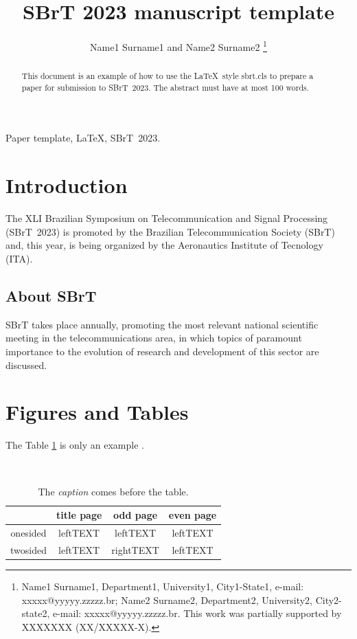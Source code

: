 \documentclass[english]{sbrt}
\begin{document}
\title{SBrT 2023 manuscript template}

\author{Name1 Surname1 and Name2 Surname2
\thanks{Name1 Surname1, Department1, University1, City1-State1, e-mail: xxxxx@yyyyy.zzzzz.br; Name2 Surname2, Department2, University2, City2-state2, e-mail: xxxxx@yyyyy.zzzzz.br. This work was partially supported by XXXXXXX (XX/XXXXX-X).}%
}

\maketitle



\begin{abstract}
This document is an example of how to use the \LaTeX\ style sbrt.cls to prepare a paper for submission to SBrT~2023. The abstract must have at most 100 words.
\end{abstract}
\begin{keywords}
Paper template, \LaTeX, SBrT~2023.
\end{keywords}


\section{Introduction}

The XLI Brazilian Symposium on Telecommunication and Signal Processing (SBrT~2023) is promoted by the Brazilian Telecommunication Society (SBrT) and, this year, is being organized by the Aeronautics Institute of Tecnology (ITA).

\subsection{About SBrT}

SBrT takes place annually, promoting the most relevant national scientific meeting in the telecommunications area, in which topics of paramount importance to the evolution of research and development of this sector are discussed.

\section{Figures and Tables}
The Table \ref{tab:tabela} is only an example \cite{ref2}.
\begin{table}[htb]
\caption{\label{tab:tabela}The \textit{caption} comes before the table.}
\begin{center}
{\tt
\begin{tabular}{|c||c|c|c|}\hline
&title page&odd page&even page\\\hline\hline
onesided&leftTEXT&leftTEXT&leftTEXT\\\hline
twosided&leftTEXT&rightTEXT&leftTEXT\\\hline
\end{tabular}
}
\end{center}
\end{table}
\end{document}
